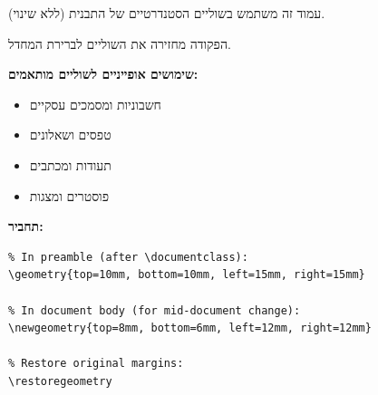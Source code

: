 \documentclass{hebrew-academic-template}
\begin{document}
\fontsize{12pt}{15pt}\selectfont

עמוד זה משתמש בשוליים הסטנדרטיים של התבנית (ללא שינוי).

הפקודה  מחזירה את השוליים לברירת המחדל.

\vspace{3mm}

\textbf{שימושים אופייניים לשוליים מותאמים:}
\begin{itemize}
\item חשבוניות ומסמכים עסקיים
\item טפסים ושאלונים
\item תעודות ומכתבים
\item פוסטרים ומצגות
\end{itemize}

\vspace{3mm}

\textbf{תחביר:}

\begin{english}
\begin{verbatim}
% In preamble (after \documentclass):
\geometry{top=10mm, bottom=10mm, left=15mm, right=15mm}

% In document body (for mid-document change):
\newgeometry{top=8mm, bottom=6mm, left=12mm, right=12mm}

% Restore original margins:
\restoregeometry
\end{verbatim}
\end{english}
\end{document}
